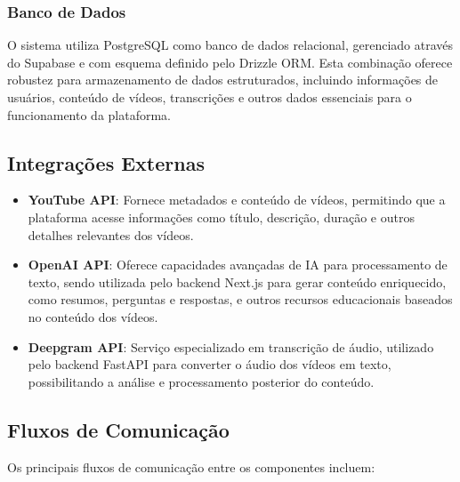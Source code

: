 \documentclass[tcc,capa]{texufpel}
\begin{document}
\subsubsection{Banco de Dados}
O sistema utiliza PostgreSQL como banco de dados relacional, gerenciado através do Supabase e com esquema definido pelo Drizzle ORM. Esta combinação oferece robustez para armazenamento de dados estruturados, incluindo informações de usuários, conteúdo de vídeos, transcrições e outros dados essenciais para o funcionamento da plataforma.

\subsection{Integrações Externas}

\begin{itemize}
    \item \textbf{YouTube API}: Fornece metadados e conteúdo de vídeos, permitindo que a plataforma acesse informações como título, descrição, duração e outros detalhes relevantes dos vídeos.
    
    \item \textbf{OpenAI API}: Oferece capacidades avançadas de IA para processamento de texto, sendo utilizada pelo backend Next.js para gerar conteúdo enriquecido, como resumos, perguntas e respostas, e outros recursos educacionais baseados no conteúdo dos vídeos.
    
    \item \textbf{Deepgram API}: Serviço especializado em transcrição de áudio, utilizado pelo backend FastAPI para converter o áudio dos vídeos em texto, possibilitando a análise e processamento posterior do conteúdo.
\end{itemize}

\subsection{Fluxos de Comunicação}

Os principais fluxos de comunicação entre os componentes incluem:
\end{document}
